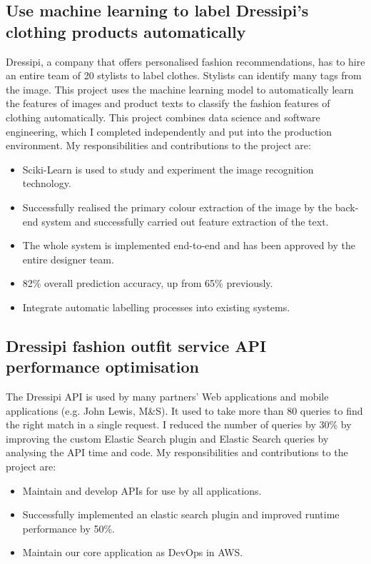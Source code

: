 \documentclass[a4paper]{twentysecondcv-english} %
\begin{document}
\subsection{Use machine learning to label Dressipi's clothing products automatically}

Dressipi, a company that offers personalised fashion recommendations, has to hire an entire team of 20 stylists to label clothes. Stylists can identify many tags from the image. This project uses the machine learning model to automatically learn the features of images and product texts to classify the fashion features of clothing automatically. This project combines data science and software engineering, which I completed independently and put into the production environment. My responsibilities and contributions to the project are:
\begin{itemize}
    \item Sciki-Learn is used to study and experiment the image recognition technology.
    \item Successfully realised the primary colour extraction of the image by the back-end system and successfully carried out feature extraction of the text.
    \item The whole system is implemented end-to-end and has been approved by the entire designer team.
    \item 82\% overall prediction accuracy, up from 65\% previously.
    \item Integrate automatic labelling processes into existing systems.
\end{itemize}

\subsection{Dressipi fashion outfit service API performance optimisation}

The Dressipi API is used by many partners' Web applications and mobile applications (e.g. John Lewis, M\&S). It used to take more than 80 queries to find the right match in a single request. I reduced the number of queries by 30\% by improving the custom Elastic Search plugin and Elastic Search queries by analysing the API time and code. My responsibilities and contributions to the project are:
\begin{itemize}
    \item Maintain and develop APIs for use by all applications.
    \item Successfully implemented an elastic search plugin and improved runtime performance by 50\%.
    \item Maintain our core application as DevOps in AWS.
\end{itemize}
\end{document}
